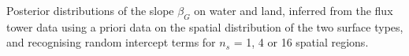 \label{fig:Beta_SWI_byS0S04S16_Stor} Posterior distributions of
the slope \(\beta_{G}\) on water and land, inferred from the flux tower
data using a priori data on the spatial distribution of the two surface
types, and recognising random intercept terms for \(n_s\) = 1, 4 or 16
spatial regions.